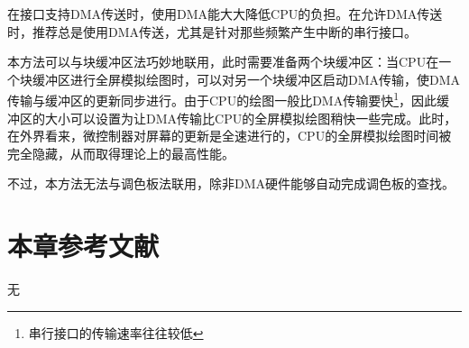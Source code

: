 在接口支持DMA传送时，使用DMA能大大降低CPU的负担。在允许DMA传送时，推荐总是使用DMA传送，尤其是针对那些频繁产生中断的串行接口。

本方法可以与块缓冲区法巧妙地联用，此时需要准备两个块缓冲区：当CPU在一个块缓冲区进行全屏模拟绘图时，可以对另一个块缓冲区启动DMA传输，使DMA传输与缓冲区的更新同步进行。由于CPU的绘图一般比DMA传输要快\footnote{串行接口的传输速率往往较低}，因此缓冲区的大小可以设置为让DMA传输比CPU的全屏模拟绘图稍快一些完成。此时，在外界看来，微控制器对屏幕的更新是全速进行的，CPU的全屏模拟绘图时间被完全隐藏，从而取得理论上的最高性能。

不过，本方法无法与调色板法联用，除非DMA硬件能够自动完成调色板的查找。

\section{本章参考文献}\label{sec:chapter-bibliography-6}

无
